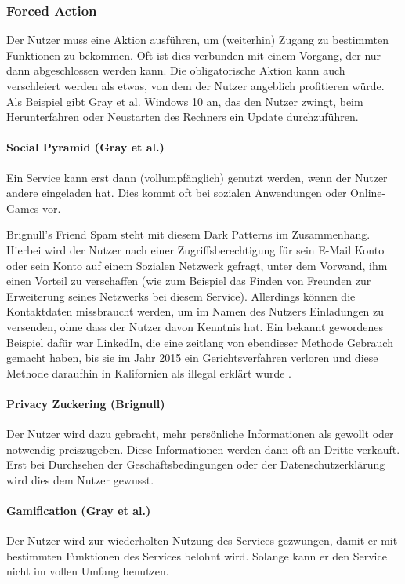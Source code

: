 \documentclass[a4paper]{article}
\begin{document}
\subsubsection{Forced Action}
Der Nutzer muss eine Aktion ausführen, um (weiterhin) Zugang zu bestimmten Funktionen zu bekommen. Oft ist dies verbunden mit einem Vorgang, der nur dann abgeschlossen werden kann. Die obligatorische Aktion kann auch verschleiert werden als etwas, von dem der Nutzer angeblich profitieren würde. 
Als Beispiel gibt Gray et al. \cite{gray} Windows 10 an, das den Nutzer zwingt, beim Herunterfahren oder Neustarten des Rechners ein Update durchzuführen.  

\paragraph{Social Pyramid (Gray et al.)}
Ein Service kann erst dann (vollumpfänglich) genutzt werden, wenn der Nutzer andere eingeladen hat. Dies kommt oft bei sozialen Anwendungen oder Online-Games vor. 

Brignull's \glqq Friend Spam\grqq{} steht mit diesem Dark Patterns im Zusammenhang. Hierbei wird der Nutzer nach einer Zugriffsberechtigung für sein E-Mail Konto oder sein Konto auf einem Sozialen Netzwerk gefragt, unter dem Vorwand, ihm einen Vorteil zu verschaffen (wie zum Beispiel das Finden von Freunden zur Erweiterung seines Netzwerks bei diesem Service). Allerdings können die Kontaktdaten missbraucht werden, um im Namen des Nutzers Einladungen zu versenden, ohne dass der Nutzer davon Kenntnis hat.
Ein bekannt gewordenes Beispiel dafür war LinkedIn, die eine zeitlang von ebendieser Methode Gebrauch gemacht haben, bis sie im Jahr 2015 ein Gerichtsverfahren verloren und diese Methode daraufhin in Kalifornien als illegal erklärt wurde \cite{brignull5}.   

\paragraph{Privacy Zuckering (Brignull)}
Der Nutzer wird dazu gebracht, mehr persönliche Informationen als gewollt oder notwendig preiszugeben. Diese Informationen werden dann oft an Dritte verkauft. Erst bei Durchsehen der Geschäftsbedingungen oder der Datenschutzerklärung wird dies dem Nutzer gewusst.

\paragraph{Gamification (Gray et al.)}
Der Nutzer wird zur wiederholten Nutzung des Services gezwungen, damit er mit bestimmten Funktionen des Services belohnt wird. Solange kann er den Service nicht im vollen Umfang benutzen. 
\end{document}
